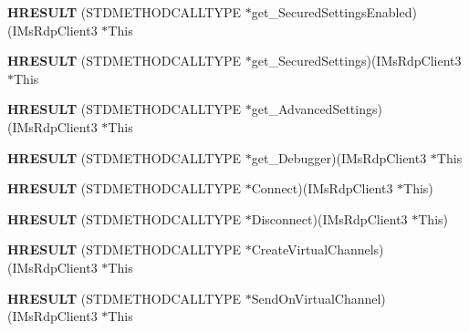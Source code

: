 \begin{DoxyCompactItemize}
\mbox{\label{struct_i_ms_rdp_client3_vtbl_a39a2199e1d3c07ed8d1ae438c4cb9652}} 
{\bfseries H\+R\+E\+S\+U\+LT} (S\+T\+D\+M\+E\+T\+H\+O\+D\+C\+A\+L\+L\+T\+Y\+PE $\ast$get\+\_\+\+Secured\+Settings\+Enabled)(I\+Ms\+Rdp\+Client3 $\ast$This
\item 
\mbox{\label{struct_i_ms_rdp_client3_vtbl_abaf9e16e800fcc829c78f34fea3caaea}} 
{\bfseries H\+R\+E\+S\+U\+LT} (S\+T\+D\+M\+E\+T\+H\+O\+D\+C\+A\+L\+L\+T\+Y\+PE $\ast$get\+\_\+\+Secured\+Settings)(I\+Ms\+Rdp\+Client3 $\ast$This
\item 
\mbox{\label{struct_i_ms_rdp_client3_vtbl_a63a6f28d4788f75750e111947c32308b}} 
{\bfseries H\+R\+E\+S\+U\+LT} (S\+T\+D\+M\+E\+T\+H\+O\+D\+C\+A\+L\+L\+T\+Y\+PE $\ast$get\+\_\+\+Advanced\+Settings)(I\+Ms\+Rdp\+Client3 $\ast$This
\item 
\mbox{\label{struct_i_ms_rdp_client3_vtbl_ae204577dec6dbda76655b58106c4f887}} 
{\bfseries H\+R\+E\+S\+U\+LT} (S\+T\+D\+M\+E\+T\+H\+O\+D\+C\+A\+L\+L\+T\+Y\+PE $\ast$get\+\_\+\+Debugger)(I\+Ms\+Rdp\+Client3 $\ast$This
\item 
\mbox{\label{struct_i_ms_rdp_client3_vtbl_a2ce26d0aa583d07cf29868d26b65e6f9}} 
{\bfseries H\+R\+E\+S\+U\+LT} (S\+T\+D\+M\+E\+T\+H\+O\+D\+C\+A\+L\+L\+T\+Y\+PE $\ast$Connect)(I\+Ms\+Rdp\+Client3 $\ast$This)
\item 
\mbox{\label{struct_i_ms_rdp_client3_vtbl_a7b8e81da7f9c9de400ec2f935d9898de}} 
{\bfseries H\+R\+E\+S\+U\+LT} (S\+T\+D\+M\+E\+T\+H\+O\+D\+C\+A\+L\+L\+T\+Y\+PE $\ast$Disconnect)(I\+Ms\+Rdp\+Client3 $\ast$This)
\item 
\mbox{\label{struct_i_ms_rdp_client3_vtbl_af1d370c69edf736f92ffacbd31f6313a}} 
{\bfseries H\+R\+E\+S\+U\+LT} (S\+T\+D\+M\+E\+T\+H\+O\+D\+C\+A\+L\+L\+T\+Y\+PE $\ast$Create\+Virtual\+Channels)(I\+Ms\+Rdp\+Client3 $\ast$This
\item 
\mbox{\label{struct_i_ms_rdp_client3_vtbl_a7727671d45e960949aa1f87d7fad1411}} 
{\bfseries H\+R\+E\+S\+U\+LT} (S\+T\+D\+M\+E\+T\+H\+O\+D\+C\+A\+L\+L\+T\+Y\+PE $\ast$Send\+On\+Virtual\+Channel)(I\+Ms\+Rdp\+Client3 $\ast$This

\end{DoxyCompactItemize}

